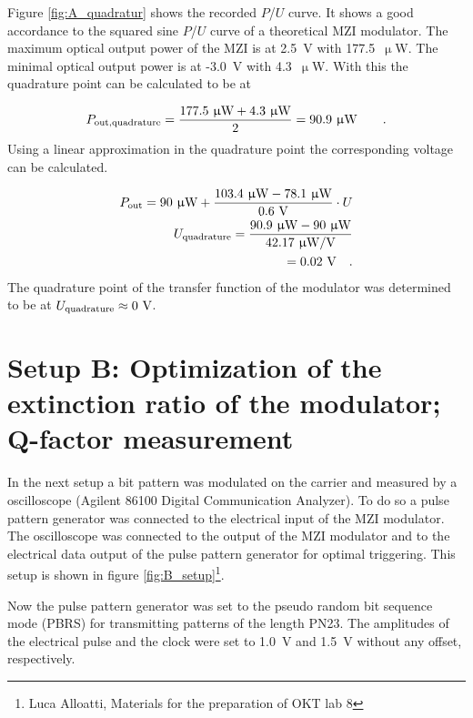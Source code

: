 Figure \ref{fig:A_quadratur} shows the recorded $P$/$U$ curve. It shows a good accordance to the squared sine $P$/$U$ curve of a theoretical MZI modulator.
The maximum optical output power of the MZI is at 2.5~V with 177.5~$\upmu$W. The minimal optical output power is at -3.0~V with 4.3~$\upmu$W. With this the quadrature point can be calculated to be at

\begin{equation}
P_{\mathrm{out,quadrature}}=\frac{177.5~\upmu \mathrm{W}+4.3~\upmu \mathrm{W}}{2}=90.9~\upmu \mathrm{W}\qquad.
\label{eq:}
\end{equation} 
Using a linear approximation in the quadrature point the corresponding voltage can be calculated.

\begin{equation}
\begin{split}
P_{\mathrm{out}}=90~\upmu \mathrm{W} + \frac{103.4~\upmu \mathrm{W}- 78.1~\upmu \mathrm{W}}{0.6~\mathrm{V}}\cdot U\\
U_{\mathrm{quadrature}}=\frac{90.9~\upmu \mathrm{W}-90~\upmu \mathrm{W}}{42.17~\upmu \mathrm{W}/\mathrm{V}}\\
=0.02~\mathrm{V} \quad.
\end{split}
\label{eq:}
\end{equation}
The quadrature point of the transfer function of the modulator was determined to be at $U_{\mathrm{quadrature}}\approx 0~\mathrm{V}$.



\section{Setup B: Optimization of the extinction ratio of the modulator; Q-factor measurement}





In the next setup a bit pattern was modulated on the carrier and measured by a oscilloscope (Agilent 86100 Digital Communication Analyzer). To do so a pulse pattern generator was connected to the electrical input of the MZI modulator. The oscilloscope was connected to the output of the MZI modulator and to the electrical data output of the pulse pattern generator for optimal triggering. This setup is shown in figure \ref{fig:B_setup}\footnote[3]{Luca Alloatti, Materials for the preparation of OKT lab 8}.

Now the pulse pattern generator was set to the pseudo random bit sequence mode (PBRS) for transmitting patterns of the length PN23. The amplitudes of the electrical pulse and the clock were set to 1.0~V and 1.5~V without any offset, respectively.


